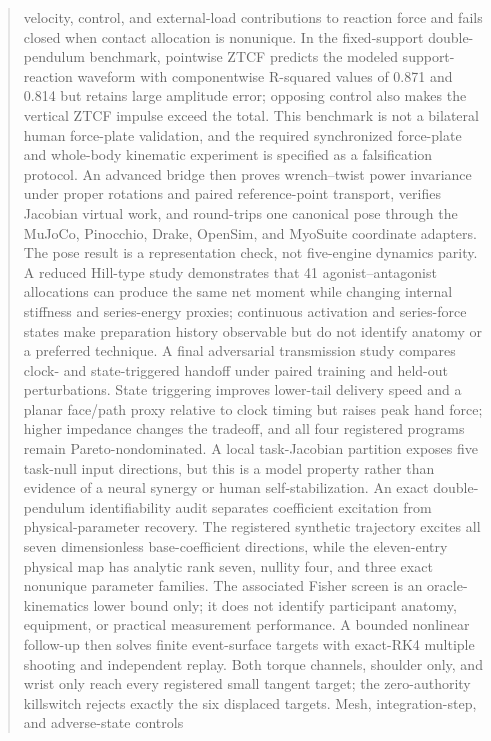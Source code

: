 \documentclass[
  letterpaper,
]{report}
\begin{document}
\begin{abstract}
velocity, control, and external-load contributions to reaction force and
fails closed when contact allocation is nonunique. In the fixed-support
double-pendulum benchmark, pointwise ZTCF predicts the modeled
support-reaction waveform with componentwise R-squared values of 0.871
and 0.814 but retains large amplitude error; opposing control also makes
the vertical ZTCF impulse exceed the total. This benchmark is not a
bilateral human force-plate validation, and the required synchronized
force-plate and whole-body kinematic experiment is specified as a
falsification protocol. An advanced bridge then proves wrench--twist
power invariance under proper rotations and paired reference-point
transport, verifies Jacobian virtual work, and round-trips one canonical
pose through the MuJoCo, Pinocchio, Drake, OpenSim, and MyoSuite
coordinate adapters. The pose result is a representation check, not
five-engine dynamics parity. A reduced Hill-type study demonstrates that
41 agonist--antagonist allocations can produce the same net moment while
changing internal stiffness and series-energy proxies; continuous
activation and series-force states make preparation history observable
but do not identify anatomy or a preferred technique. A final
adversarial transmission study compares clock- and state-triggered
handoff under paired training and held-out perturbations. State
triggering improves lower-tail delivery speed and a planar face/path
proxy relative to clock timing but raises peak hand force; higher
impedance changes the tradeoff, and all four registered programs remain
Pareto-nondominated. A local task-Jacobian partition exposes five
task-null input directions, but this is a model property rather than
evidence of a neural synergy or human self-stabilization. An exact
double-pendulum identifiability audit separates coefficient excitation
from physical-parameter recovery. The registered synthetic trajectory
excites all seven dimensionless base-coefficient directions, while the
eleven-entry physical map has analytic rank seven, nullity four, and
three exact nonunique parameter families. The associated Fisher screen
is an oracle-kinematics lower bound only; it does not identify
participant anatomy, equipment, or practical measurement performance. A
bounded nonlinear follow-up then solves finite event-surface targets
with exact-RK4 multiple shooting and independent replay. Both torque
channels, shoulder only, and wrist only reach every registered small
tangent target; the zero-authority killswitch rejects exactly the six
displaced targets. Mesh, integration-step, and adverse-state controls

\end{abstract}
\end{document}
